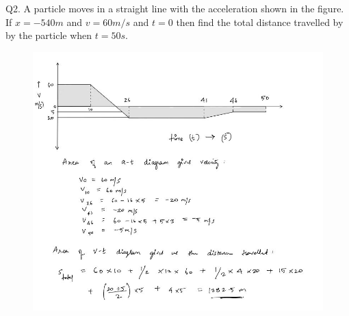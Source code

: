 \documentclass[11pt]{article}
\begin{document}
\pagebreak
Q2. A particle moves in a straight line with the acceleration shown in the figure. If $x = -540m$ and $v = 60m/s$ and $t = 0$ then find the total distance travelled by by the particle when $t = 50s$.
\begin{figure}[H]
	\includegraphics[scale=0.7]{g2.jpg}
	\label{fig: Polygon Law}
\end{figure}

\pagebreak
\end{document}
